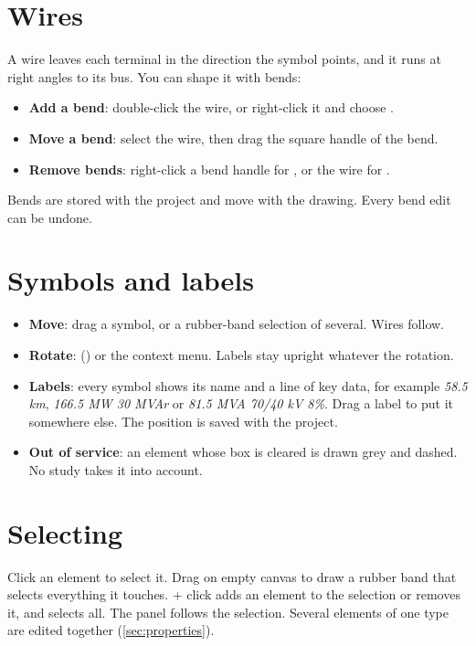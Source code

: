 \section{Wires}

A wire leaves each terminal in the direction the symbol points, and it runs at right
angles to its bus. You can shape it with bends:

\begin{itemize}
  \item \textbf{Add a bend}: double-click the wire, or right-click it and choose
    .
  \item \textbf{Move a bend}: select the wire, then drag the square handle of the bend.
  \item \textbf{Remove bends}: right-click a bend handle for , or
    the wire for .
\end{itemize}

Bends are stored with the project and move with the drawing. Every bend edit can be
undone.

\section{Symbols and labels}

\begin{itemize}
  \item \textbf{Move}: drag a symbol, or a rubber-band selection of several. Wires follow.
  \item \textbf{Rotate}:  () or the
    context menu. Labels stay upright whatever the rotation.
  \item \textbf{Labels}: every symbol shows its name and a line of key data, for example
    \emph{58.5 km}, \emph{166.5 MW 30 MVAr} or \emph{81.5 MVA 70/40 kV 8\%}. Drag a label
    to put it somewhere else. The position is saved with the project.
  \item \textbf{Out of service}: an element whose  box is cleared is drawn
    grey and dashed. No study takes it into account.
\end{itemize}

\section{Selecting}

Click an element to select it. Drag on empty canvas to draw a rubber band that selects
everything it touches. \keys{\ctrl} + click adds an element to the selection or removes
it, and  selects all. The  panel follows the selection.
Several elements of one type are edited together (\cref{sec:properties}).

